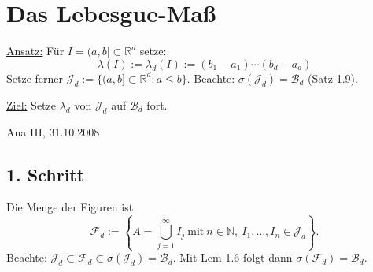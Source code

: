 \documentclass[a4paper]{report}
\newcommand{\R}{\mathbb{R}}
\newcommand{\N}{\mathbb{N}}
\newcommand{\Borel}{\mathcal{B}}
\newcommand{\Bd}{\Borel_d}
\newcommand{\Fd}{\mathcal{F}_d}
\newcommand{\Jd}{\mathcal{J}_d}
\newcommand{\jlabel}[1]{\label{j_#1}}
\newcommand{\jhyperref}[2]{\hyperref[j_#1]{#2}}
\newcommand{\jlink}[1]{\jhyperref{#1}{#1}}
\newcommand{\jspacesmall}{\vspace{4pt}}
\newcommand{\jdate}[1]{\jspacesmall\begin{center}\jlabel{#1}\tiny{Ana III, #1}\end{center}}
\theoremstyle{plain}
\theoremstyle{definition}
\begin{document}
{{\section{Das Lebesgue-Maß}

\uline{Ansatz:} Für $I=(a,b] \subset \R^d$ setze:
\jlabel{(1.2)}
\begin{equation}
    \lambda(I) := \lambda_d(I) := (b_1-a_1) \cdots (b_d-a_d)
\end{equation}
Setze ferner $\Jd := \{(a,b] \subset \R^d: a \le b\}$. Beachte: $\sigma(\Jd) = \Bd$ (\jlink{Satz 1.9}).

\jspacesmall

\uline{Ziel:} Setze $\lambda_d$ von $\Jd$ auf $\Bd$ fort.

\jdate{31.10.2008}

\subsection*{1. Schritt}

Die Menge der Figuren ist
\begin{displaymath}
    \Fd := \left \{A = \bigcup_{j=1}^\infty I_j \ \text{mit} \ n\in\N, \ I_1, \dots, I_n \in  \Jd \right \}.
\end{displaymath}
Beachte: $\Jd \subset \Fd \subset \sigma(\Jd) = \Bd$. Mit \jlink{Lem 1.6} folgt dann $\sigma(\Fd) = \Bd$.

}}
\end{document}
